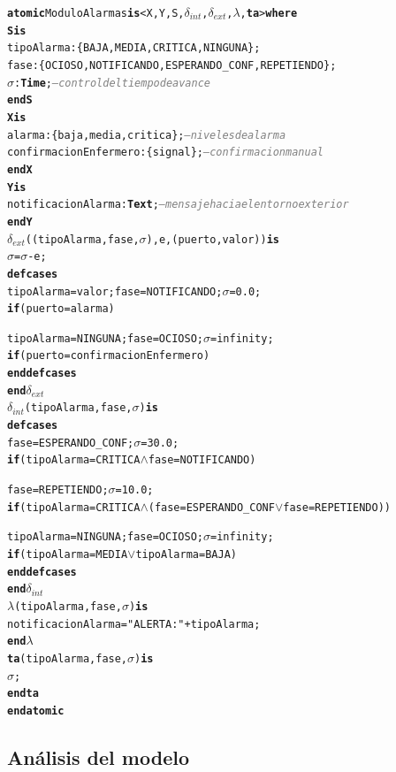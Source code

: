 \documentclass[12pt, a4paper]{article}
\newcommand{\cmlwedge}{$\wedge$}
\newcommand{\cmlvee}{$\vee$}
\newcommand{\kw}[1]{\textbf{#1}}          %
\newcommand{\cmlTime}{\textbf{Time}}
\newcommand{\cmlsigma}{$\sigma$}
\newcommand{\dint}{$\delta_{\mathit{int}}$}
\newcommand{\dext}{$\delta_{\mathit{ext}}$}
\newcommand{\clambda}{$\lambda$}
\newcommand{\cmlta}{\textbf{ta}}
\newcommand{\cmlcomment}[1]{\textit{\textcolor{gray}{#1}}}
\newenvironment{cmldevs}{%
  \begin{alltt}\small%
}{%
  \end{alltt}%
}
\begin{document}
\begin{center}
\begin{cmldevs}
\kw{atomic} ModuloAlarmas \kw{is} <X, Y, S, \dint{}, \dext{}, \clambda{}, \cmlta{}> \kw{where}
\kw{S is}
    tipoAlarma : \{BAJA, MEDIA, CRITICA, NINGUNA\};
    fase       : \{OCIOSO, NOTIFICANDO, ESPERANDO\_CONF, REPETIENDO\};
    \cmlsigma{}      : \cmlTime{}; \cmlcomment{-- control del tiempo de avance}
\kw{end S}
\kw{X is}
    alarma                : \{baja, media, critica\}; \cmlcomment{-- niveles de alarma}
    confirmacionEnfermero : \{signal\};               \cmlcomment{-- confirmacion manual}
\kw{end X}
\kw{Y is}
    notificacionAlarma : \kw{Text}; \cmlcomment{-- mensaje hacia el entorno exterior}
\kw{end Y}
\dext{}((tipoAlarma, fase, \cmlsigma{}), e, (puerto, valor)) \kw{is}
    \cmlsigma{} = \cmlsigma{} - e;
    \kw{defcases}
        tipoAlarma = valor; fase = NOTIFICANDO; \cmlsigma{} = 0.0; 
            \kw{if} (puerto = alarma)
            
        tipoAlarma = NINGUNA; fase = OCIOSO; \cmlsigma{} = infinity; 
            \kw{if} (puerto = confirmacionEnfermero)
    \kw{end defcases}
\kw{end} \dext{}
\dint{}(tipoAlarma, fase, \cmlsigma{}) \kw{is}
    \kw{defcases}
        fase = ESPERANDO\_CONF; \cmlsigma{} = 30.0; 
            \kw{if} (tipoAlarma = CRITICA \cmlwedge{} fase = NOTIFICANDO)
            
        fase = REPETIENDO; \cmlsigma{} = 10.0; 
            \kw{if} (tipoAlarma = CRITICA \cmlwedge{} (fase = ESPERANDO\_CONF \cmlvee{} fase = REPETIENDO))
            
        tipoAlarma = NINGUNA; fase = OCIOSO; \cmlsigma{} = infinity; 
            \kw{if} (tipoAlarma = MEDIA \cmlvee{} tipoAlarma = BAJA)
    \kw{end defcases}
\kw{end} \dint{}
\clambda{}(tipoAlarma, fase, \cmlsigma{}) \kw{is}
    notificacionAlarma = "ALERTA: " + tipoAlarma;
\kw{end} \clambda{}
\cmlta{}(tipoAlarma, fase, \cmlsigma{}) \kw{is}
    \cmlsigma{};
\kw{end} \cmlta{}
\kw{end atomic}
\end{cmldevs}
\label{fig:modulo-alarmas}
\end{center}

\subsection*{Análisis del modelo}
\end{document}
